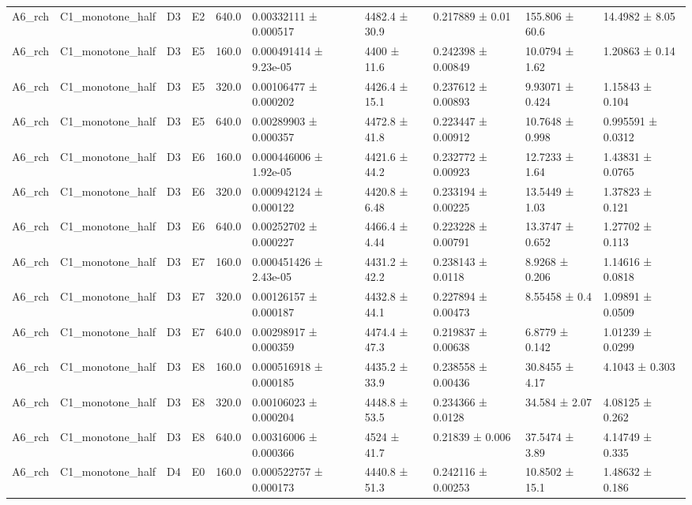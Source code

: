 \begin{table}
\begin{tabular}{llllllllll}
A6\_rch & C1\_monotone\_half & D3 & E2 & 640.0 & 0.00332111 ± 0.000517 & 4482.4 ± 30.9 & 0.217889 ± 0.01 & 155.806 ± 60.6 & 14.4982 ± 8.05 \\
A6\_rch & C1\_monotone\_half & D3 & E5 & 160.0 & 0.000491414 ± 9.23e-05 & 4400 ± 11.6 & 0.242398 ± 0.00849 & 10.0794 ± 1.62 & 1.20863 ± 0.14 \\
A6\_rch & C1\_monotone\_half & D3 & E5 & 320.0 & 0.00106477 ± 0.000202 & 4426.4 ± 15.1 & 0.237612 ± 0.00893 & 9.93071 ± 0.424 & 1.15843 ± 0.104 \\
A6\_rch & C1\_monotone\_half & D3 & E5 & 640.0 & 0.00289903 ± 0.000357 & 4472.8 ± 41.8 & 0.223447 ± 0.00912 & 10.7648 ± 0.998 & 0.995591 ± 0.0312 \\
A6\_rch & C1\_monotone\_half & D3 & E6 & 160.0 & 0.000446006 ± 1.92e-05 & 4421.6 ± 44.2 & 0.232772 ± 0.00923 & 12.7233 ± 1.64 & 1.43831 ± 0.0765 \\
A6\_rch & C1\_monotone\_half & D3 & E6 & 320.0 & 0.000942124 ± 0.000122 & 4420.8 ± 6.48 & 0.233194 ± 0.00225 & 13.5449 ± 1.03 & 1.37823 ± 0.121 \\
A6\_rch & C1\_monotone\_half & D3 & E6 & 640.0 & 0.00252702 ± 0.000227 & 4466.4 ± 4.44 & 0.223228 ± 0.00791 & 13.3747 ± 0.652 & 1.27702 ± 0.113 \\
A6\_rch & C1\_monotone\_half & D3 & E7 & 160.0 & 0.000451426 ± 2.43e-05 & 4431.2 ± 42.2 & 0.238143 ± 0.0118 & 8.9268 ± 0.206 & 1.14616 ± 0.0818 \\
A6\_rch & C1\_monotone\_half & D3 & E7 & 320.0 & 0.00126157 ± 0.000187 & 4432.8 ± 44.1 & 0.227894 ± 0.00473 & 8.55458 ± 0.4 & 1.09891 ± 0.0509 \\
A6\_rch & C1\_monotone\_half & D3 & E7 & 640.0 & 0.00298917 ± 0.000359 & 4474.4 ± 47.3 & 0.219837 ± 0.00638 & 6.8779 ± 0.142 & 1.01239 ± 0.0299 \\
A6\_rch & C1\_monotone\_half & D3 & E8 & 160.0 & 0.000516918 ± 0.000185 & 4435.2 ± 33.9 & 0.238558 ± 0.00436 & 30.8455 ± 4.17 & 4.1043 ± 0.303 \\
A6\_rch & C1\_monotone\_half & D3 & E8 & 320.0 & 0.00106023 ± 0.000204 & 4448.8 ± 53.5 & 0.234366 ± 0.0128 & 34.584 ± 2.07 & 4.08125 ± 0.262 \\
A6\_rch & C1\_monotone\_half & D3 & E8 & 640.0 & 0.00316006 ± 0.000366 & 4524 ± 41.7 & 0.21839 ± 0.006 & 37.5474 ± 3.89 & 4.14749 ± 0.335 \\
A6\_rch & C1\_monotone\_half & D4 & E0 & 160.0 & 0.000522757 ± 0.000173 & 4440.8 ± 51.3 & 0.242116 ± 0.00253 & 10.8502 ± 15.1 & 1.48632 ± 0.186 \\

\end{tabular}
\end{table}
